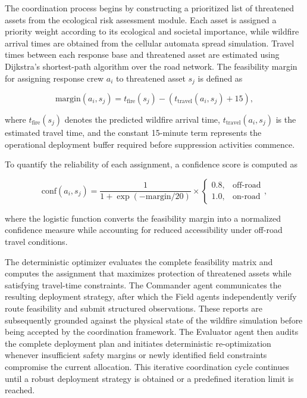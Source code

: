 \documentclass{ieeeaccess}
\begin{document}
The coordination process begins by constructing a prioritized list of threatened assets from the ecological risk assessment module. Each asset is assigned a priority weight according to its ecological and societal importance, while wildfire arrival times are obtained from the cellular automata spread simulation. Travel times between each response base and threatened asset are estimated using Dijkstra's shortest-path algorithm over the road network. The feasibility margin for assigning response crew $a_i$ to threatened asset $s_j$ is defined as

\begin{equation}
\text{margin}(a_i,s_j)=
t_{\text{fire}}(s_j)
-
\left(
t_{\text{travel}}(a_i,s_j)+15
\right),
\label{eq:margin}
\end{equation}

where $t_{\text{fire}}(s_j)$ denotes the predicted wildfire arrival time, $t_{\text{travel}}(a_i,s_j)$ is the estimated travel time, and the constant 15-minute term represents the operational deployment buffer required before suppression activities commence.

To quantify the reliability of each assignment, a confidence score is computed as

\begin{equation}
\text{conf}(a_i,s_j)
=
\frac{1}
{1+\exp(-\text{margin}/20)}
\times
\begin{cases}
0.8, & \text{off-road}\\
1.0, & \text{on-road}
\end{cases},
\label{eq:conf}
\end{equation}

where the logistic function converts the feasibility margin into a normalized confidence measure while accounting for reduced accessibility under off-road travel conditions.

The deterministic optimizer evaluates the complete feasibility matrix and computes the assignment that maximizes protection of threatened assets while satisfying travel-time constraints. The Commander agent communicates the resulting deployment strategy, after which the Field agents independently verify route feasibility and submit structured observations. These reports are subsequently grounded against the physical state of the wildfire simulation before being accepted by the coordination framework. The Evaluator agent then audits the complete deployment plan and initiates deterministic re-optimization whenever insufficient safety margins or newly identified field constraints compromise the current allocation. This iterative coordination cycle continues until a robust deployment strategy is obtained or a predefined iteration limit is reached.
\end{document}
